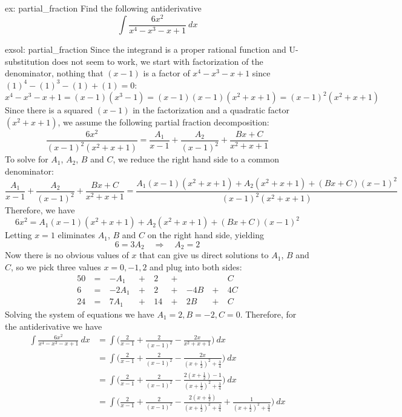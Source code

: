 \begin{ex}[]{ex: partial_fraction}
    Find the following antiderivative
    \[\int \frac{6x^2}{x^4-x^3-x+1}~dx\]
\end{ex}
\begin{exsol}[]{exsol: partial_fraction}
    Since the integrand is a proper rational function and U-substitution does not seem to work, we start with factorization of the denominator, nothing that $(x-1)$ is a factor of $x^4-x^3-x+1$ since $(1)^4 - (1)^3 - (1) + (1) = 0$:
    \[x^4-x^3-x+1 = (x-1)(x^3-1) = (x-1)(x-1)(x^2+x+1) = (x-1)^2(x^2+x+1)\]
    Since there is a squared $(x-1)$ in the factorization and a quadratic factor $(x^2+x+1)$, we assume the following partial fraction decomposition:
    \[\frac{6x^2}{(x-1)^2(x^2+x+1)} = \frac{A_1}{x-1} + \frac{A_2}{(x-1)^2} + \frac{Bx+C}{x^2+x+1}\]
    To solve for $A_1$, $A_2$, $B$ and $C$, we reduce the right hand side to a common denominator:
    \[\frac{A_1}{x-1} + \frac{A_2}{(x-1)^2}+ \frac{Bx+C}{x^2+x+1} = \frac{A_1(x-1)(x^2+x+1)+A_2(x^2+x+1)+(Bx+C)(x-1)^2}{(x-1)^2(x^2+x+1)}\]
    Therefore, we have
    \[6x^2 = A_1(x-1)(x^2+x+1)+A_2(x^2+x+1)+(Bx+C)(x-1)^2\]
    Letting $x=1$ eliminates $A_1$, $B$ and $C$ on the right hand side, yielding
    \[6 = 3A_2 \quad \Rightarrow \quad A_2 = 2\]
    Now there is no obvious values of $x$ that can give us direct solutions to $A_1$, $B$ and $C$, so we pick three values $x = 0, -1, 2$ and plug into both sides:
    \begin{alignat*}{5}
        0 &~=~&- A_1 &~+~& 2 &~+~& && C\\
        6 &~=~&-2A_1 &~+~& 2 &~+~& -4B &~+~& 4C\\
        24 &~=~&7A_1 &~+~& 14 &~+~& 2B &~+~& C
    \end{alignat*}
    Solving the system of equations we have $A_1 = 2, B = -2, C = 0$.  Therefore, for the antiderivative we have
    \begin{align*}
        \int \frac{6x^2}{x^4-x^3-x+1}~dx &= \int \Big(\frac{2}{x-1} + \frac{2}{(x-1)^2} - \frac{2x}{x^2+x+1}\Big)~dx\\
        &= \int \Big(\frac{2}{x-1} + \frac{2}{(x-1)^2} - \frac{2x}{(x+\frac{1}{2})^2+\frac{3}{4}}\Big)~dx\\
        &= \int \Big(\frac{2}{x-1} + \frac{2}{(x-1)^2} - \frac{2(x+\frac{1}{2})-1}{(x+\frac{1}{2})^2+\frac{3}{4}}\Big)~dx\\
        &= \int \Big(\frac{2}{x-1} + \frac{2}{(x-1)^2} - \frac{2(x+\frac{1}{2})}{(x+\frac{1}{2})^2+\frac{3}{4}} + \frac{1}{(x+\frac{1}{2})^2+\frac{3}{4}}\Big)~dx\\

\end{align*}
\end{exsol}
